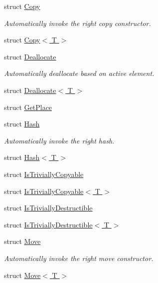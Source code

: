 \begin{DoxyCompactItemize}
struct \hyperlink{structvt_1_1util_1_1adt_1_1detail_1_1_copy}{Copy}
\begin{DoxyCompactList}\small\item\em Automatically invoke the right copy constructor. \end{DoxyCompactList}\item 
struct \hyperlink{structvt_1_1util_1_1adt_1_1detail_1_1_copy_3_01_t_01_4}{Copy$<$ T $>$}
\item 
struct \hyperlink{structvt_1_1util_1_1adt_1_1detail_1_1_deallocate}{Deallocate}
\begin{DoxyCompactList}\small\item\em Automatically deallocate based on active element. \end{DoxyCompactList}\item 
struct \hyperlink{structvt_1_1util_1_1adt_1_1detail_1_1_deallocate_3_01_t_01_4}{Deallocate$<$ T $>$}
\item 
struct \hyperlink{structvt_1_1util_1_1adt_1_1detail_1_1_get_place}{Get\+Place}
\item 
struct \hyperlink{structvt_1_1util_1_1adt_1_1detail_1_1_hash}{Hash}
\begin{DoxyCompactList}\small\item\em Automatically invoke the right hash. \end{DoxyCompactList}\item 
struct \hyperlink{structvt_1_1util_1_1adt_1_1detail_1_1_hash_3_01_t_01_4}{Hash$<$ T $>$}
\item 
struct \hyperlink{structvt_1_1util_1_1adt_1_1detail_1_1_is_trivially_copyable}{Is\+Trivially\+Copyable}
\item 
struct \hyperlink{structvt_1_1util_1_1adt_1_1detail_1_1_is_trivially_copyable_3_01_t_01_4}{Is\+Trivially\+Copyable$<$ T $>$}
\item 
struct \hyperlink{structvt_1_1util_1_1adt_1_1detail_1_1_is_trivially_destructible}{Is\+Trivially\+Destructible}
\item 
struct \hyperlink{structvt_1_1util_1_1adt_1_1detail_1_1_is_trivially_destructible_3_01_t_01_4}{Is\+Trivially\+Destructible$<$ T $>$}
\item 
struct \hyperlink{structvt_1_1util_1_1adt_1_1detail_1_1_move}{Move}
\begin{DoxyCompactList}\small\item\em Automatically invoke the right move constructor. \end{DoxyCompactList}\item 
struct \hyperlink{structvt_1_1util_1_1adt_1_1detail_1_1_move_3_01_t_01_4}{Move$<$ T $>$}

\end{DoxyCompactItemize}
